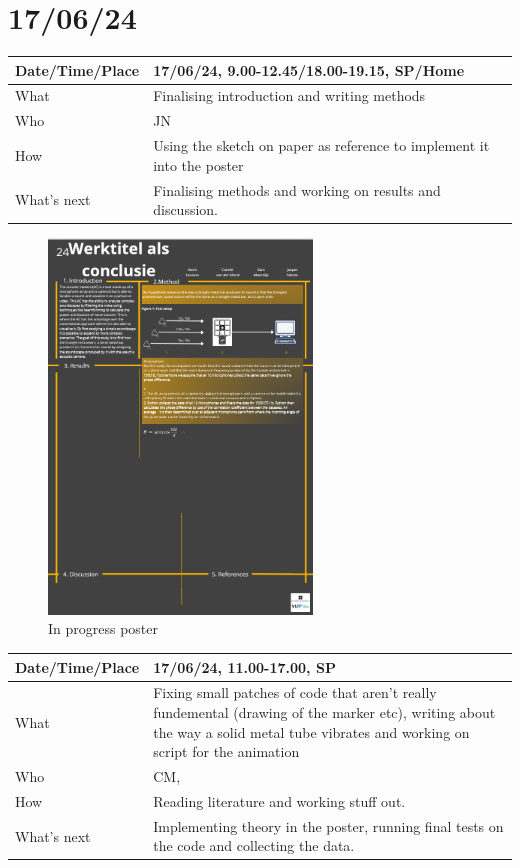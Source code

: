 \documentclass{article}
\begin{document}
\section{17/06/24}

\begin{table}[H]
\begin{tabular}{|p{1.5in}|p{4in}|}
\hline
Date/Time/Place & 17/06/24, 9.00-12.45/18.00-19.15, SP/Home \\ \hline
What            & Finalising introduction and writing methods \\ \hline
Who             & JN \\ \hline
How             & Using the sketch on paper as reference to implement it into the poster \\ \hline
What's next     & Finalising methods and working on results and discussion. \\ \hline
\end{tabular}
\end{table}

\begin{figure}[H]
    \centering
    \includegraphics[width=7cm]{inprogressposterV2.png}
    \caption{In progress poster}   
\end{figure}

\begin{table}[H]
\begin{tabular}{|p{1.5in}|p{4in}|}
\hline
Date/Time/Place & 17/06/24, 11.00-17.00, SP \\ \hline
What            & Fixing small patches of code that aren't really fundemental (drawing of the marker etc), writing about the way a solid metal tube vibrates and working on script for the animation\\ \hline
Who             & CM,\\ \hline
How             & Reading literature and working stuff out.\\ \hline
What's next     & Implementing theory in the poster, running final tests on the code and collecting the data.  \\ \hline
\end{tabular}
\end{table}
\end{document}
